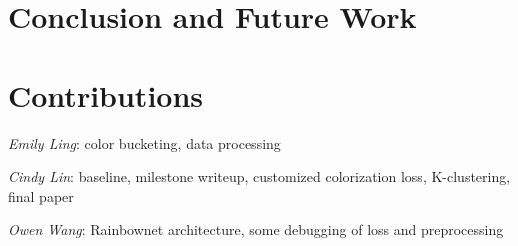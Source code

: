 \documentclass{article} %
\begin{document}
\section{Conclusion and Future Work}


\section{Contributions}

\emph{Emily Ling}: color bucketing, data processing

\emph{Cindy Lin}: baseline, milestone writeup, customized colorization loss, K-clustering, final paper

\emph{Owen Wang}: Rainbownet architecture, some debugging of loss and preprocessing
\end{document}
